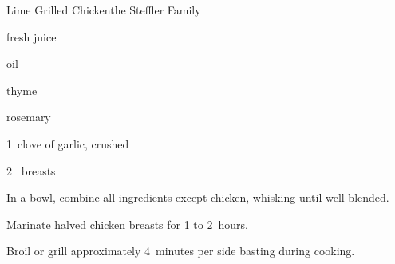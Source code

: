 \begin{recipe}{Lime Grilled Chicken}{the Steffler Family}{}

\begin{ingredients}
\item \C{\half} fresh  juice
\item \C{\quarter} oil
\item {} 
\item {} thyme
\item {} rosemary
\item 1~clove of garlic, crushed 
\item 2~ breasts
\end{ingredients}

\begin{directions}
\item In a bowl, combine all ingredients except chicken, whisking until well blended.
\item Marinate halved chicken breasts for 1 to 2~hours.
\item Broil or grill approximately 4~minutes per side basting during cooking.
\end{directions}
\end{recipe}
